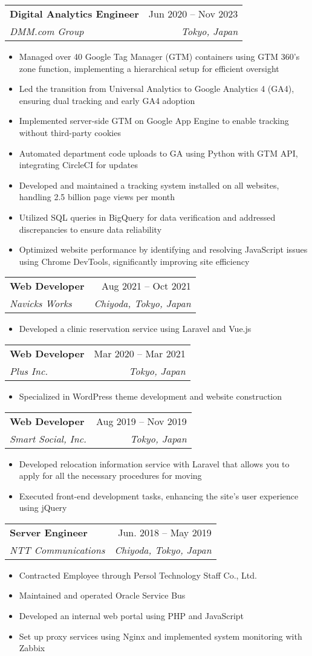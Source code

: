 \documentclass[letterpaper,11pt]{article}
\makeatletter
\newcommand{\resumeItem}[1]{
  \item\small{
    {#1 \vspace{-2pt}}
  }
}
\newcommand{\resumeSubheading}[4]{
  \vspace{-2pt}\item
    \begin{tabular*}{0.97\textwidth}[t]{l@{\extracolsep{\fill}}r}
      \textbf{#1} & #2 \\
      \textit{\small#3} & \textit{\small #4} \\
    \end{tabular*}\vspace{-7pt}
}
\newcommand{\resumeItemListStart}{\begin{itemize}}
\newcommand{\resumeItemListEnd}{\end{itemize}\vspace{-5pt}}
\makeatother
\begin{document}
    \resumeSubheading
      {Digital Analytics Engineer}{Jun 2020 -- Nov 2023}
      {DMM.com Group}{Tokyo, Japan}
      \resumeItemListStart
        \resumeItem{Managed over 40 Google Tag Manager (GTM) containers using GTM 360's zone function, implementing a hierarchical setup for efficient oversight}
        \resumeItem{Led the transition from Universal Analytics to Google Analytics 4 (GA4), ensuring dual tracking and early GA4 adoption}
        \resumeItem{Implemented server-side GTM on Google App Engine to enable tracking without third-party cookies}
        \resumeItem{Automated department code uploads to GA using Python with GTM API, integrating CircleCI for updates}
        \resumeItem{Developed and maintained a tracking system installed on all websites, handling 2.5 billion page views per month}
        \resumeItem{Utilized SQL queries in BigQuery for data verification and addressed discrepancies to ensure data reliability}
        \resumeItem{Optimized website performance by identifying and resolving JavaScript issues using Chrome DevTools, significantly improving site efficiency}
      \resumeItemListEnd

    \resumeSubheading
      {Web Developer}{Aug 2021 -- Oct 2021}
      {Navicks Works}{Chiyoda, Tokyo, Japan}
      \resumeItemListStart
        \resumeItem{Developed a clinic reservation service using Laravel and Vue.js}
      \resumeItemListEnd

    \resumeSubheading
      {Web Developer}{Mar 2020 -- Mar 2021}
      {Plus Inc.}{Tokyo, Japan}
      \resumeItemListStart
        \resumeItem{Specialized in WordPress theme development and website construction}
      \resumeItemListEnd

    \resumeSubheading
      {Web Developer}{Aug 2019 -- Nov 2019}
      {Smart Social, Inc.}{Tokyo, Japan}
      \resumeItemListStart
        \resumeItem{Developed relocation information service with Laravel that allows you to apply for all the necessary procedures for moving}
        \resumeItem{Executed front-end development tasks, enhancing the site's user experience using jQuery}
      \resumeItemListEnd

    \resumeSubheading
      {Server Engineer}{Jun. 2018 -- May 2019}
      {NTT Communications}{Chiyoda, Tokyo, Japan}
      \resumeItemListStart
        \resumeItem{Contracted Employee through Persol Technology Staff Co., Ltd.}
        \resumeItem{Maintained and operated Oracle Service Bus}
        \resumeItem{Developed an internal web portal using PHP and JavaScript}
        \resumeItem{Set up proxy services using Nginx and implemented system monitoring with Zabbix}
      \resumeItemListEnd
\end{document}
